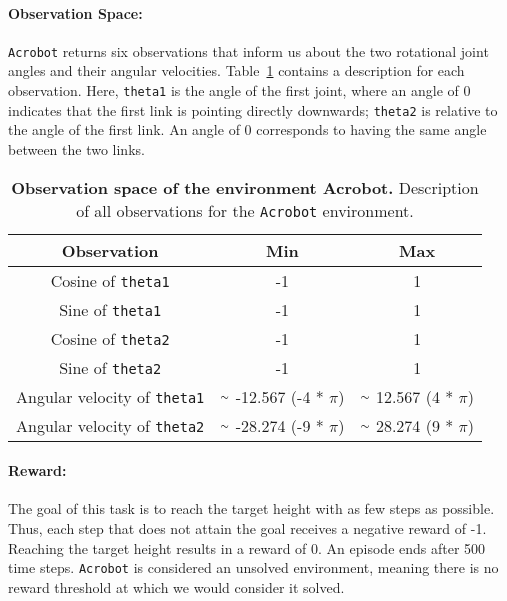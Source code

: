 \paragraph*{Observation Space:} \verb|Acrobot| returns six observations that inform us about the two rotational joint angles and their angular velocities. Table~\ref{table:acrobot_obs} contains a description for each observation. Here, \verb|theta1| is the angle of the first joint, where an angle of 0 indicates that the first link is pointing directly downwards; \verb|theta2| is relative to the angle of the first link. An angle of 0 corresponds to having the same angle between the two links.
\begin{table}[!ht]
  \centering
  \begin{tabular}{ |c|c|c| }
    \hline
    Observation & Min & Max \\
    \hline
    Cosine of \verb|theta1| & -1 & 1 \\
    Sine of \verb|theta1| & -1 & 1 \\
    Cosine of \verb|theta2| & -1 & 1 \\
    Sine of \verb|theta2| & -1 & 1 \\
    Angular velocity of \verb|theta1| & $\smallsim$ -12.567 (-4 * $\pi$) & $\smallsim$ 12.567 (4 * $\pi$) \\
    Angular velocity of \verb|theta2| & $\smallsim$ -28.274 (-9 * $\pi$) & $\smallsim$ 28.274 (9 * $\pi$) \\
    \hline
  \end{tabular}
  \caption[Observation space of the environment Acrobot]{
    \textbf{Observation space of the environment Acrobot.}
    Description of all observations for the \texttt{Acrobot} environment.
  }
  \label{table:acrobot_obs}
\end{table}

\paragraph*{Reward:} The goal of this task is to reach the target height with as few steps as possible. Thus, each step that does not attain the goal receives a negative reward of -1. Reaching the target height results in a reward of 0. An episode ends after 500 time steps. \verb|Acrobot| is considered an unsolved environment, meaning there is no reward threshold at which we would consider it solved.

